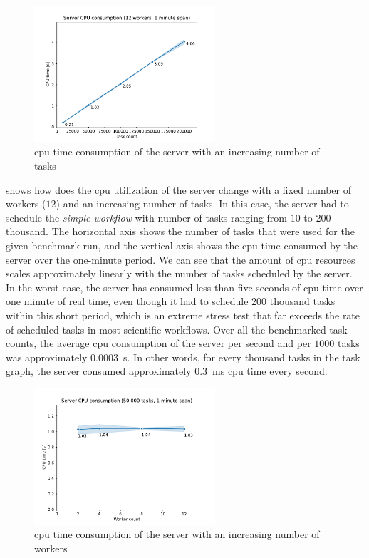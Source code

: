 \begin{figure}[h]
	\centering
	\includegraphics[width=0.6\textwidth]{imgs/hq/charts/server-utilization-tasks}
	\caption{\gls{cpu} time consumption of the \hyperqueue{} server with an increasing
	number of tasks}
	\label{fig:hq-server-cpu-consumption-tasks}
\end{figure}

 shows how does the \gls{cpu} utilization of the
server change with a fixed number of workers ($12$) and an increasing number of
tasks. In this case, the server had to schedule the \emph{simple workflow} with number of tasks
ranging from $10$ to $200$ thousand. The horizontal axis shows
the number of tasks that were used for the given benchmark run, and the vertical axis shows the
\gls{cpu} time consumed by the server over the one-minute period. We can see that the
amount of \gls{cpu} resources scales approximately linearly with the number of tasks
scheduled by the server. In the worst case, the server has consumed less than five seconds of
\gls{cpu} time over one minute of real time, even though it had to schedule
$200$ thousand tasks within this short period, which is an extreme stress test
that far exceeds the rate of scheduled tasks in most scientific workflows. Over all the benchmarked
task counts, the average \gls{cpu} consumption of the server per second and per
$1000$ tasks was approximately \SI{0.0003}{\second}. In other words, for every
thousand tasks in the task graph, the server consumed approximately \SI{0.3}{\milli\second}
\gls{cpu} time every second.

\begin{figure}[h]
	\centering
	\includegraphics[width=0.6\textwidth]{imgs/hq/charts/server-utilization-workers}
	\caption{\gls{cpu} time consumption of the \hyperqueue{} server with an increasing
	number of workers}
	\label{fig:hq-server-cpu-consumption-workers}
\end{figure}

